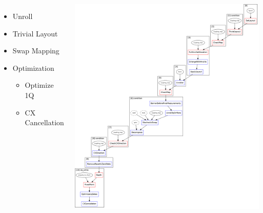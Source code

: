 \documentclass[aspectratio=169,11pt,hyperref={colorlinks=true}]{beamer}
\begin{document}
\begin{frame}
{    \begin{columns}
        \begin{itemize}
            \item Unroll
            \item Trivial Layout
            \item Swap Mapping
            \item Optimization
                \begin{itemize}
                    \item Optimize 1Q
                    \item CX Cancellation
                \end{itemize}
        \end{itemize}
        \includegraphics[width=\textwidth,height=\textheight,keepaspectratio]{preset_level_1.png}
    \end{columns}
    }
\end{frame}
\end{document}
